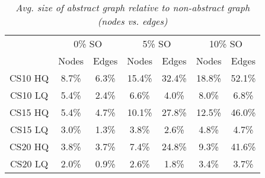 \begin{table}[ht]
\begin{center}
\caption{\small{\emph{Avg. size of abstract graph relative to non-abstract graph (nodes vs. edges)}}}
\label{aha-table:graphsize}
\begin{tabular*}{0.49\textwidth}{@{\extracolsep{\fill}}ccccccc}%
  \hline
 & \multicolumn{2}{c}{\small{0\% SO}} & \multicolumn{2}{c}{\small{5\% SO}} & \multicolumn{2}{c}{\small{10\% SO}} \\
 & \small{Nodes} & \small{Edges} & \small{Nodes} & \small{Edges} & \small{Nodes} & \small{Edges} \\
  \hline
  \small{CS10 HQ} & \small{8.7\%} & \small{6.3\%} & \small{15.4\%} & \small{32.4\%} & \small{18.8\%} & \small{52.1\%} \\
  \small{CS10 LQ} & \small{5.4\%} & \small{2.4\%} & \small{6.6\%}  & \small{4.0\%}  & \small{8.0\%}  & \small{6.8\%} \\
  \small{CS15 HQ} & \small{5.4\%} & \small{4.7\%} & \small{10.1\%}  & \small{27.8\%} & \small{12.5\%}  & \small{46.0\%} \\
  \small{CS15 LQ} & \small{3.0\%} & \small{1.3\%} & \small{3.8\%}  & \small{2.6\%}  & \small{4.8\%}  & \small{4.7\%} \\
  \small{CS20 HQ} & \small{3.8\%} & \small{3.7\%} & \small{7.4\%}  & \small{24.8\%} & \small{9.3\%}  & \small{41.6\%} \\
  \small{CS20 LQ} & \small{2.0\%} & \small{0.9\%} & \small{2.6\%}  & \small{1.8\%}  & \small{3.4\%}  & \small{3.7\%} \\
   \hline
\end{tabular*}
\end{center}
\end{table}
